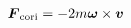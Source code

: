 \documentclass[10pt]{article}
\begin{document}
\begin{align*}{\boldsymbol F}_{\rm cori} =  - 2 m {\boldsymbol \omega  } \times { \boldsymbol v  }\end{align*}
\end{document}
